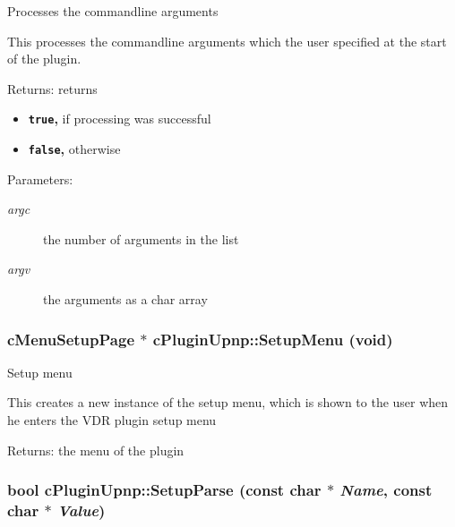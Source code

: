 Processes the commandline arguments

This processes the commandline arguments which the user specified at the start of the plugin.

\begin{Desc}
\item[Returns:]returns\begin{itemize}
\item {\bf {\tt true},} if processing was successful\item {\bf {\tt false},} otherwise \end{itemize}
\end{Desc}
\begin{Desc}
\item[Parameters:]
\begin{description}
\item[{\em argc}]the number of arguments in the list \item[{\em argv}]the arguments as a char array \end{description}
\end{Desc}
 \hypertarget{classcPluginUpnp_9b1891ed7e2d3aa56dae03b778d616ee}{
\subsubsection[{SetupMenu}]{\setlength{\rightskip}{0pt plus 5cm}cMenuSetupPage $\ast$ cPluginUpnp::SetupMenu (void)}}
\label{classcPluginUpnp_9b1891ed7e2d3aa56dae03b778d616ee}


Setup menu

This creates a new instance of the setup menu, which is shown to the user when he enters the VDR plugin setup menu

\begin{Desc}
\item[Returns:]the menu of the plugin \end{Desc}
\hypertarget{classcPluginUpnp_3f8b911f1e452789110e69b11587ebce}{
\subsubsection[{SetupParse}]{\setlength{\rightskip}{0pt plus 5cm}bool cPluginUpnp::SetupParse (const char $\ast$ {\em Name}, \/  const char $\ast$ {\em Value})}}
\label{classcPluginUpnp_3f8b911f1e452789110e69b11587ebce}


